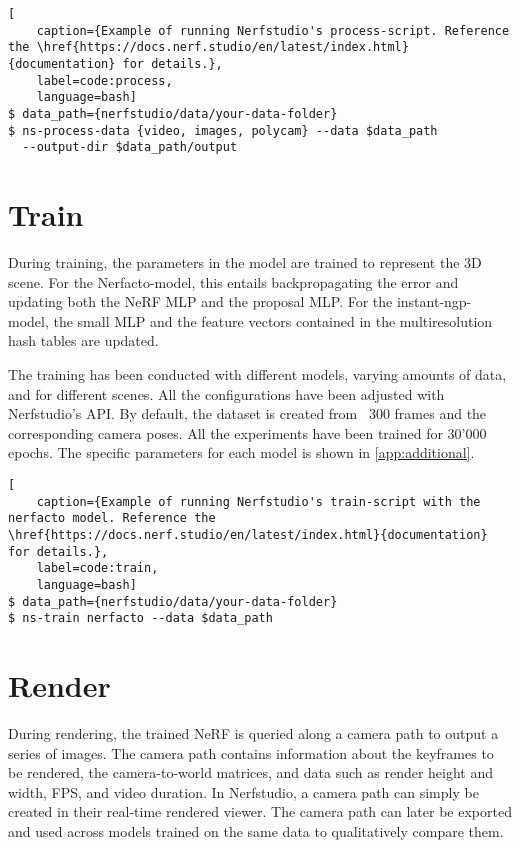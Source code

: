 \begin{lstlisting}[
    caption={Example of running Nerfstudio's process-script. Reference the \href{https://docs.nerf.studio/en/latest/index.html}{documentation} for details.},
    label=code:process,
    language=bash]
$ data_path={nerfstudio/data/your-data-folder}
$ ns-process-data {video, images, polycam} --data $data_path 
  --output-dir $data_path/output
\end{lstlisting}


\section{Train}
During training, the parameters in the model are trained to represent the 3D scene. For the Nerfacto-model, this entails backpropagating the error and updating both the NeRF MLP and the proposal MLP. For the instant-ngp-model, the small MLP and the feature vectors contained in the multiresolution hash tables are updated.

The training has been conducted with different models, varying amounts of data, and for different scenes. All the configurations have been adjusted with Nerfstudio's API. By default, the dataset is created from ~300 frames and the corresponding camera poses. All the experiments have been trained for 30'000 epochs. The specific parameters for each model is shown in \autoref{app:additional}.

\begin{lstlisting}[
    caption={Example of running Nerfstudio's train-script with the nerfacto model. Reference the \href{https://docs.nerf.studio/en/latest/index.html}{documentation} for details.},
    label=code:train,
    language=bash]
$ data_path={nerfstudio/data/your-data-folder}
$ ns-train nerfacto --data $data_path
\end{lstlisting}

\section{Render}
During rendering, the trained NeRF is queried along a camera path to output a series of images. The camera path contains information about the keyframes to be rendered, the camera-to-world matrices, and data such as render height and width, FPS, and video duration. In Nerfstudio, a camera path can simply be created in their real-time rendered viewer. The camera path can later be exported and used across models trained on the same data to qualitatively compare them.

